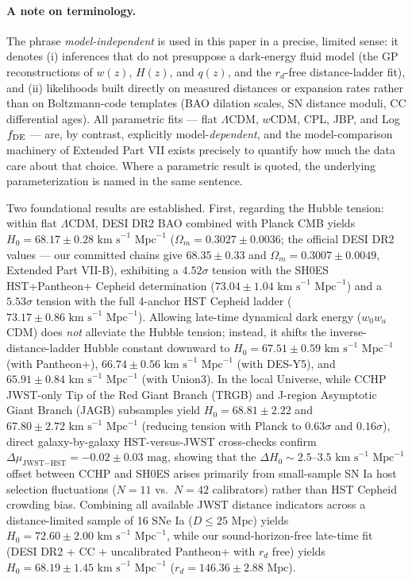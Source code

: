 \documentclass[aps,prd,preprint,superscriptaddress,nofootinbib]{revtex4-2}
\begin{document}
{\paragraph{A note on terminology.} The phrase \emph{model-independent} is used in this paper in a precise, limited sense: it denotes (i) inferences that do not presuppose a dark-energy fluid model (the GP reconstructions of $w(z)$, $H(z)$, and $q(z)$, and the $r_d$-free distance-ladder fit), and (ii) likelihoods built directly on measured distances or expansion rates rather than on Boltzmann-code templates (BAO dilation scales, SN distance moduli, CC differential ages). All parametric fits --- flat $\Lambda$CDM, $w$CDM, CPL, JBP, and Log $f_{\rm DE}$ --- are, by contrast, explicitly model-\emph{dependent}, and the model-comparison machinery of Extended Part VII exists precisely to quantify how much the data care about that choice. Where a parametric result is quoted, the underlying parameterization is named in the same sentence.

Two foundational results are established. First, regarding the Hubble tension: within flat $\Lambda$CDM, DESI DR2 BAO combined with Planck CMB yields $H_0 = 68.17 \pm 0.28\text{ km s}^{-1}\text{ Mpc}^{-1}$ ($\Omega_m = 0.3027 \pm 0.0036$; the official DESI DR2 values --- our committed chains give $68.35 \pm 0.33$ and $\Omega_m = 0.3007 \pm 0.0049$, Extended Part VII-B), exhibiting a $4.52\sigma$ tension with the SH0ES HST+Pantheon+ Cepheid determination ($73.04 \pm 1.04\text{ km s}^{-1}\text{ Mpc}^{-1}$) and a $5.53\sigma$ tension with the full 4-anchor HST Cepheid ladder ($73.17 \pm 0.86\text{ km s}^{-1}\text{ Mpc}^{-1}$). Allowing late-time dynamical dark energy ($w_0 w_a$CDM) does \emph{not} alleviate the Hubble tension; instead, it shifts the inverse-distance-ladder Hubble constant downward to $H_0 = 67.51 \pm 0.59\text{ km s}^{-1}\text{ Mpc}^{-1}$ (with Pantheon+), $66.74 \pm 0.56\text{ km s}^{-1}\text{ Mpc}^{-1}$ (with DES-Y5), and $65.91 \pm 0.84\text{ km s}^{-1}\text{ Mpc}^{-1}$ (with Union3). In the local Universe, while CCHP JWST-only Tip of the Red Giant Branch (TRGB) and J-region Asymptotic Giant Branch (JAGB) subsamples yield $H_0 = 68.81 \pm 2.22$ and $67.80 \pm 2.72\text{ km s}^{-1}\text{ Mpc}^{-1}$ (reducing tension with Planck to $0.63\sigma$ and $0.16\sigma$), direct galaxy-by-galaxy HST-versus-JWST cross-checks confirm $\Delta\mu_{\text{JWST}-\text{HST}} = -0.02 \pm 0.03\text{ mag}$, showing that the $\Delta H_0 \sim 2.5\text{--}3.5\text{ km s}^{-1}\text{ Mpc}^{-1}$ offset between CCHP and SH0ES arises primarily from small-sample SN Ia host selection fluctuations ($N=11$ vs.\ $N=42$ calibrators) rather than HST Cepheid crowding bias. Combining all available JWST distance indicators across a distance-limited sample of 16 SNe Ia ($D \le 25\text{ Mpc}$) yields $H_0 = 72.60 \pm 2.00\text{ km s}^{-1}\text{ Mpc}^{-1}$, while our sound-horizon-free late-time fit (DESI DR2 + CC + uncalibrated Pantheon+ with $r_d$ free) yields $H_0 = 68.19 \pm 1.45\text{ km s}^{-1}\text{ Mpc}^{-1}$ ($r_d = 146.36 \pm 2.88\text{ Mpc}$).

}
\end{document}
